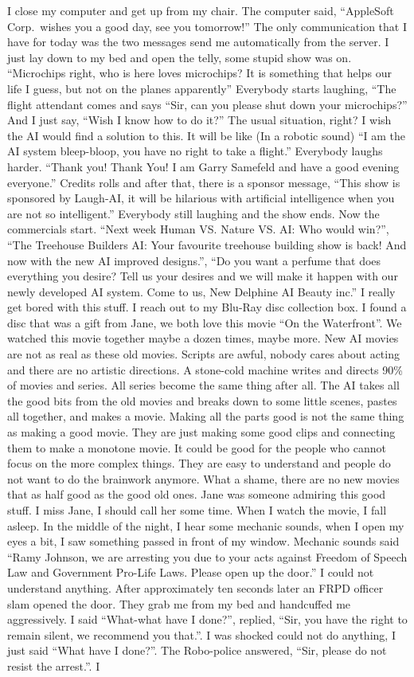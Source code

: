 \documentclass[]{book}
\begin{document}
I close my computer and get up from my chair. The computer said, ``AppleSoft Corp.~wishes you a good day, see you tomorrow!'' The only communication that I have for today was the two messages send me automatically from the server. I just lay down to my bed and open the telly, some stupid show was on. ``Microchips right, who is here loves microchips? It is something that helps our life I guess, but not on the planes apparently'' Everybody starts laughing, ``The flight attendant comes and says ``Sir, can you please shut down your microchips?'' And I just say, ``Wish I know how to do it?'' The usual situation, right? I wish the AI would find a solution to this. It will be like (In a robotic sound) ``I am the AI system bleep-bloop, you have no right to take a flight.'' Everybody laughs harder. ``Thank you! Thank You! I am Garry Samefeld and have a good evening everyone.'' Credits rolls and after that, there is a sponsor message, ``This show is sponsored by Laugh-AI, it will be hilarious with artificial intelligence when you are not so intelligent.'' Everybody still laughing and the show ends. Now the commercials start. ``Next week Human VS. Nature VS. AI: Who would win?'', ``The Treehouse Builders AI: Your favourite treehouse building show is back! And now with the new AI improved designs.'', ``Do you want a perfume that does everything you desire? Tell us your desires and we will make it happen with our newly developed AI system. Come to us, New Delphine AI Beauty inc.'' I really get bored with this stuff. I reach out to my Blu-Ray disc collection box. I found a disc that was a gift from Jane, we both love this movie ``On the Waterfront''. We watched this movie together maybe a dozen times, maybe more. New AI movies are not as real as these old movies. Scripts are awful, nobody cares about acting and there are no artistic directions. A stone-cold machine writes and directs 90\% of movies and series. All series become the same thing after all. The AI takes all the good bits from the old movies and breaks down to some little scenes, pastes all together, and makes a movie. Making all the parts good is not the same thing as making a good movie. They are just making some good clips and connecting them to make a monotone movie. It could be good for the people who cannot focus on the more complex things. They are easy to understand and people do not want to do the brainwork anymore. What a shame, there are no new movies that as half good as the good old ones. Jane was someone admiring this good stuff. I miss Jane, I should call her some time. When I watch the movie, I fall asleep. In the middle of the night, I hear some mechanic sounds, when I open my eyes a bit, I saw something passed in front of my window. Mechanic sounds said ``Ramy Johnson, we are arresting you due to your acts against Freedom of Speech Law and Government Pro-Life Laws. Please open up the door.'' I could not understand anything. After approximately ten seconds later an FRPD officer slam opened the door. They grab me from my bed and handcuffed me aggressively. I said ``What-what have I done?'', replied, ``Sir, you have the right to remain silent, we recommend you that.''. I was shocked could not do anything, I just said ``What have I done?''. The Robo-police answered, ``Sir, please do not resist the arrest.''. I 
\end{document}
